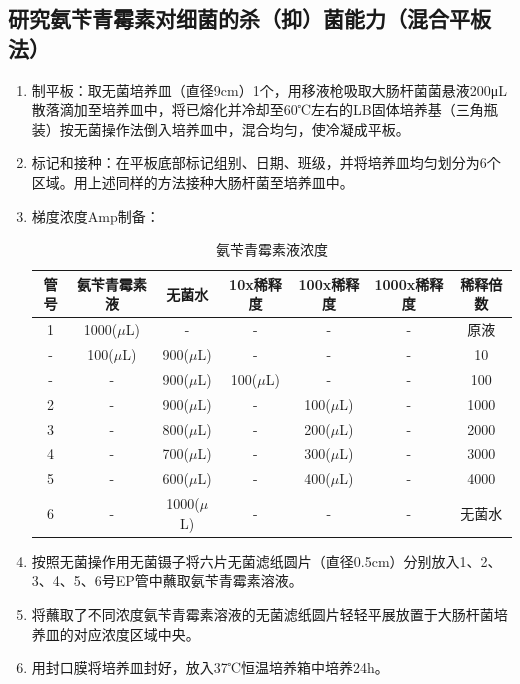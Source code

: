 \documentclass[UTF8]{ctexart}
\begin{document}
    \subsection{研究氨苄青霉素对细菌的杀（抑）菌能力（混合平板法）}
    \begin{enumerate}
        \setlength{\parsep}{-40pt}
        \setlength{\itemsep}{-2pt}
        \item 制平板：取无菌培养皿（直径9cm）1个，用移液枪吸取大肠杆菌菌悬液200μL散落滴加至培养皿中，将已熔化并冷却至60℃左右的LB固体培养基（三角瓶装）按无菌操作法倒入培养皿中，混合均匀，使冷凝成平板。
        \item 标记和接种：在平板底部标记组别、日期、班级，并将培养皿均匀划分为6个区域。用上述同样的方法接种大肠杆菌至培养皿中。
        \item 梯度浓度Amp制备：
            \linespread{1.25}
            \begin{table}[h]
                \centering
                \caption{氨苄青霉素液浓度}
                \begin{tabular}{ccccccc}
                \hline
                管号 & 氨苄青霉素液       & 无菌水          & 10x稀释度       & 100x稀释度      & 1000x稀释度     & 稀释倍数 \\ \hline
                1  & 1000($\mu$L) & -            & -           & -           & -           & 原液   \\
                -  & 100($\mu$L)  & 900($\mu$L)  & -           & -           & -           & 10    \\
                -  & -            & 900($\mu$L)  & 100($\mu$L) & -           & -           & 100   \\
                2  & -            & 900($\mu$L)  & -           & 100($\mu$L) & -           & 1000  \\
                3  & -            & 800($\mu$L)  & -           & 200($\mu$L) & -           & 2000  \\
                4  & -            & 700($\mu$L)  & -           & 300($\mu$L) & -           & 3000  \\
                5  & -            & 600($\mu$L)  & -           & 400($\mu$L) & -           & 4000  \\
                6  & -            & 1000($\mu$L) & -           & -           & -           & 无菌水  \\ \hline
                \end{tabular}
            \end{table}
        \item 按照无菌操作用无菌镊子将六片无菌滤纸圆片（直径0.5cm）分别放入1、2、3、4、5、6号EP管中蘸取氨苄青霉素溶液。
        \item 将蘸取了不同浓度氨苄青霉素溶液的无菌滤纸圆片轻轻平展放置于大肠杆菌培养皿的对应浓度区域中央。
        \item 用封口膜将培养皿封好，放入37℃恒温培养箱中培养24h。

    \end{enumerate}
\end{document}
